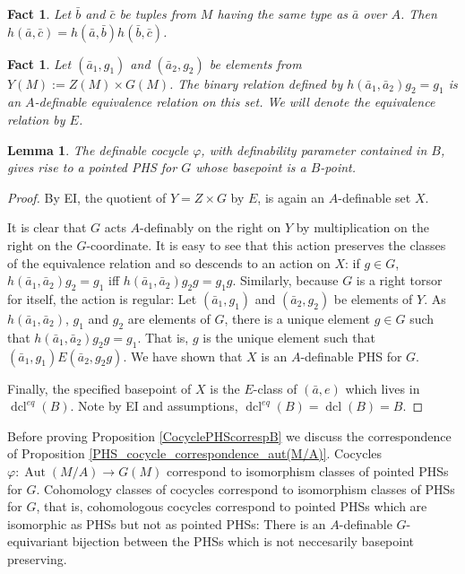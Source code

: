 \documentclass{article}
\theoremstyle{problemstyle}
\newtheorem{lemma}[problem]{Lemma}
\newtheorem{fact}[problem]{Fact}
\DeclareMathOperator{\aut}{Aut} %
\DeclareMathOperator{\dcl}{dcl} %
\begin{document}
\begin{fact}\label{cocycle consequence for h}
     Let $\bar{b}$ and $\bar{c}$ be tuples from $M$ having the same type as $\bar{a}$ over $A$. Then $h(\bar{a},\bar{c}) = h(\bar{a},\bar{b})h(\bar{b},\bar{c})$. 
\end{fact}

\begin{fact}
    Let $(\bar{a}_1,g_1)$ and $(\bar{a}_2,g_2)$ be elements from $Y(M):= Z(M) \times G(M)$. The binary relation defined by $h(\bar{a}_1,\bar{a}_2)g_2 = g_1$ is an $A$-definable equivalence relation on this set. We will denote the equivalence relation by $E$.
\end{fact}

\begin{lemma}\label{cocycle to pPHS}
    The definable cocycle $\varphi$, with definability parameter contained in $B$, gives rise to a pointed PHS for $G$ whose basepoint is a $B$-point.
\end{lemma}

\begin{proof}
    By EI, the quotient of $Y = Z \times G$ by $E$, is again an $A$-definable set $X$. 

    It is clear that $G$ acts $A$-definably on the right on $Y$ by multiplication on the right on the $G$-coordinate. It is easy to see that this action preserves the classes of the equivalence relation and so descends to an action on $X$: if $g \in G$, $h(\bar{a}_1,\bar{a}_2)g_2 = g_1$ iff $h(\bar{a}_1,\bar{a}_2)g_2g = g_1g$. Similarly, because $G$ is a right torsor for itself, the action is regular: Let $(\bar{a}_1,g_1)$ and $(\bar{a}_2,g_2)$ be elements of $Y$. As $h(\bar{a}_1,\bar{a}_2)$, $g_1$ and $g_2$ are elements of $G$, there is a unique element $g \in G$ such that $h(\bar{a}_1,\bar{a}_2)g_2g = g_1$. That is, $g$ is the unique element such that $(\bar{a}_1,g_1)E(\bar{a}_2,g_2g)$. We have shown that $X$ is an $A$-definable PHS for $G$. 
    
    Finally, the specified basepoint of $X$ is the $E$-class of $(\bar{a},e)$ which lives in $\dcl^{eq}(B)$. Note by EI and assumptions, $\dcl^{eq}(B) = \dcl(B) = B$.
\end{proof}

Before proving Proposition \ref{CocyclePHScorrespB} we discuss the correspondence of Proposition \ref{PHS_cocycle_correspondence_aut(M/A)}. Cocycles $\varphi:\aut(M/A) \to G(M)$ correspond to isomorphism classes of pointed PHSs for $G$. Cohomology classes of cocycles correspond to isomorphism classes of PHSs for $G$, that is, cohomologous cocycles correspond to pointed PHSs which are isomorphic as PHSs but not as pointed PHSs: There is an $A$-definable $G$-equivariant bijection between the PHSs which is not neccesarily basepoint preserving.
\end{document}
